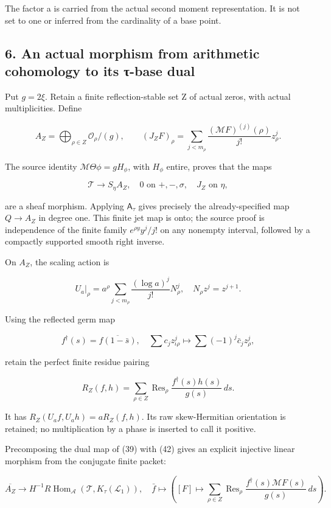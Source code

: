 \documentclass[
]{article}
\begin{document}
The factor a is carried from the actual second moment representation. It
is not set to one or inferred from the cardinality of a base point.

\subsection{6. An actual morphism from arithmetic cohomology to its
τ-base
dual}\label{an-actual-morphism-from-arithmetic-cohomology-to-its-ux3c4-base-dual}

Put \(g=2\xi\). Retain a finite reflection-stable set Z of actual zeros,
with actual multiplicities. Define

\[
A_Z=\bigoplus_{\rho\in Z}\mathcal O_\rho/(g),
\qquad
(J_ZF)_\rho=\sum_{j<m_\rho}
\frac{(\mathcal MF)^{(j)}(\rho)}{j!}z_\rho^j.
\tag{38}
\]

The source identity \(\mathcal M\Theta\phi=gH_\phi\), with \(H_\phi\)
entire, proves that the maps

\[
\mathcal T\longrightarrow S_\eta A_Z,
\quad 0\text{ on }+, -,\sigma,\quad J_Z\text{ on }\eta,
\tag{39}
\]

are a sheaf morphism. Applying \(\mathsf A_\tau\) gives precisely the
already-specified map \(Q\to A_Z\) in degree one. This finite jet map is
onto; the source proof is independence of the finite family
\(e^{\rho y}y^j/j!\) on any nonempty interval, followed by a compactly
supported smooth right inverse.

On \(A_Z\), the scaling action is

\[
U_a|_\rho=a^\rho\sum_{j<m_\rho}\frac{(\log a)^j}{j!}N_\rho^j,
\quad N_\rho z^j=z^{j+1}.
\tag{40}
\]

Using the reflected germ map

\[
f^\dagger(s)=\overline{f(1-\bar s)},
\quad
\sum c_jz_{\iota\rho}^j\mapsto\sum(-1)^j\bar c_jz_\rho^j,
\tag{41}
\]

retain the perfect finite residue pairing

\[
R_Z(f,h)=\sum_{\rho\in Z}\operatorname{Res}_\rho
\frac{f^\dagger(s)h(s)}{g(s)}\,ds.
\tag{42}
\]

It has \(R_Z(U_af,U_ah)=aR_Z(f,h)\). Its raw skew-Hermitian orientation
is retained; no multiplication by a phase is inserted to call it
positive.

Precomposing the dual map of (39) with (42) gives an explicit injective
linear morphism from the conjugate finite packet:

\[
\boxed{
\overline{A_Z}\longrightarrow
H^{-1}R\operatorname{Hom}_{\mathcal A}(\mathcal T,K_\tau(\mathcal L_1)),
\quad
\bar f\longmapsto
\left([F]\longmapsto\sum_{\rho\in Z}\operatorname{Res}_\rho
\frac{f^\dagger(s)\mathcal MF(s)}{g(s)}\,ds\right).
}
\tag{43}
\]
\end{document}
